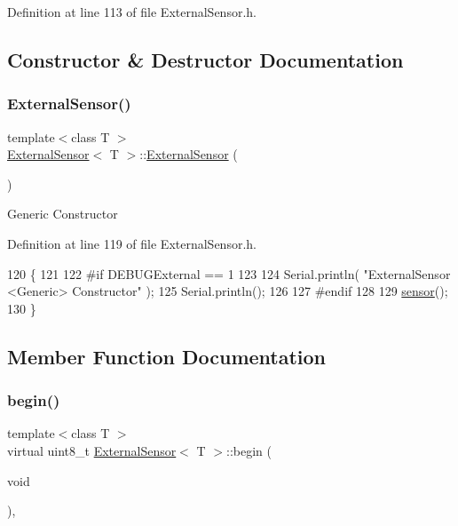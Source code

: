 Definition at line 113 of file External\+Sensor.\+h.



\subsection{Constructor \& Destructor Documentation}
\mbox{\label{class_external_sensor_a8b991447fba33253103d06198b838751}} 
\subsubsection{\texorpdfstring{External\+Sensor()}{ExternalSensor()}}
{\footnotesize\ttfamily template$<$class T $>$ \\
\hyperlink{class_external_sensor}{External\+Sensor}$<$ T $>$\+::\hyperlink{class_external_sensor}{External\+Sensor} (\begin{DoxyParamCaption}{ }\end{DoxyParamCaption})\hspace{0.3cm}{\ttfamily [inline]}}

Generic Constructor 

Definition at line 119 of file External\+Sensor.\+h.


\begin{DoxyCode}
120     \{
121     
122 \textcolor{preprocessor}{    #if DEBUGExternal == 1 }
123 
124         Serial.println( \textcolor{stringliteral}{"ExternalSensor <Generic> Constructor"} );
125         Serial.println();
126     
127 \textcolor{preprocessor}{    #endif}
128 
129         \hyperlink{class_external_sensor_a6e1f518119abe08c14b498ce24a7e1b3}{sensor}();
130     \}
\end{DoxyCode}


\subsection{Member Function Documentation}
\mbox{\label{class_external_sensor_ab6fe1379d55b656a048e0fba1e0a32e6}} 
\subsubsection{\texorpdfstring{begin()}{begin()}}
{\footnotesize\ttfamily template$<$class T $>$ \\
virtual uint8\+\_\+t \hyperlink{class_external_sensor}{External\+Sensor}$<$ T $>$\+::begin (\begin{DoxyParamCaption}\item[{void}]{ }\end{DoxyParamCaption})\hspace{0.3cm}{\ttfamily [inline]}, {\ttfamily [virtual]}}

